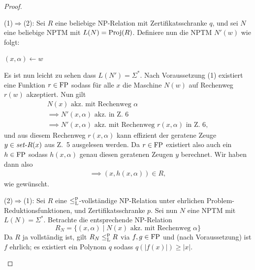 \begin{proof}
\begin{prooflist}[label={}]
\item (1)$\Rightarrow$(2): 
    Sei $R$ eine beliebige NP-Relation mit Zertifikatsschranke $q$, und
    sei $N$ eine beliebige NPTM mit $L(N)=\operatorname{Proj}(R)$. Definiere nun die NPTM $N'(w)$ wie folgt:\\
    \begin{algorithm}[H]
        $(x, \alpha)\gets w$\;
    \end{algorithm}
    Es ist nun leicht zu sehen dass $L(N')=\Sigma^*$. Nach Voraussetzung (1) existiert eine Funktion $r\in\mathrm{FP}$ sodass für alle $x$ die Maschine $N(w)$ auf Rechenweg $r(w)$ akzeptiert.
    Nun gilt
    \begin{gather*}
        N(x) \text{ akz. mit Rechenweg $\alpha$}\\
        \implies N'(x,\alpha) \text{ akz. in Z.~6}\\
        \implies N'(x,\alpha) \text{ akz. mit Rechenweg $r(x,\alpha)$ in Z.~6},
    \end{gather*}
    und aus diesem Rechenweg $r(x,\alpha)$ kann effizient der geratene Zeuge $y\in \mathit{set}\text{-}{}R(x)$ aus Z.~5 ausgelesen werden.
    Da $r\in\mathrm{FP}$ existiert also auch ein $h\in\mathrm{FP}$ sodass $h(x,\alpha)$ genau diesen geratenen Zeugen $y$ berechnet.
    Wir haben dann also
    \begin{gather*}
        \implies (x, h(x, \alpha))\in R,
    \end{gather*}
    wie gewünscht.

\item (2)$\Rightarrow$(1): 
    Sei $R$ eine $\leq_\mathrm{L}^\mathrm{p}$-vollständige NP-Relation unter ehrlichen Problem-Reduktionsfunktionen, und Zertifikatsschranke $p$.
    Sei nun $N$ eine NPTM mit $L(N)=\Sigma^*$. Betrachte die entsprechende NP-Relation
    \[ R_N = \{ (x,\alpha) \mid N(x) \text{ akz. mit Rechenweg $\alpha$} \} \]
    Da $R$ ja vollständig ist, gilt $R_N\leq_\mathrm{L}^\mathrm{p} R$ via $f,g\in\mathrm{FP}$ und (nach Voraussetzung) ist $f$ ehrlich; es existiert ein Polynom $q$ sodass $q(|f(x)|)\geq |x|$.


\end{prooflist}
\end{proof}
